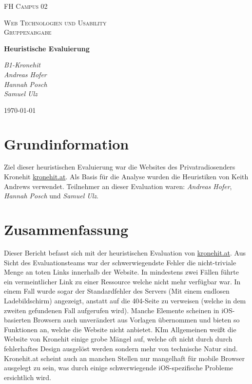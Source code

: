 \documentclass{article}
\begin{document}
	\begin{titlepage}
		\centering
		{\scshape\LARGE FH Campus 02 \par}
		\vspace{1cm}
		{\scshape\Large Web Technologien und Usability \\ Gruppenabgabe\par}
		\vspace{1.5cm}
		{\huge\bfseries Heuristische Evaluierung\par}
		\vspace{2cm}
		{\Large\itshape B1-Kronehit \\ Andreas Hofer \\ Hannah Posch \\ Samuel Ulz\par}
		\vfill
		{\large \today\par}
	\end{titlepage}
	\tableofcontents
	\newpage
	\section{Grundinformation}
	Ziel dieser heuristischen Evaluierung war die Websites des Privatradiosenders Kronehit \href{https://kronehit.at}{kronehit.at}. Als Basis für die Analyse wurden die Heuristiken von Keith Andrews verwendet. Teilnehmer an dieser Evaluation waren: \textit{Andreas Hofer}, \textit{Hannah Posch} und \textit{Samuel Ulz}.
	\section{Zusammenfassung}
	Dieser Bericht befasst sich mit der heuristischen Evaluation von \href{https://kronehit.at}{kronehit.at}. Aus Sicht des Evaluationsteams war der schwerwiegendste Fehler die nicht-triviale Menge an toten Links innerhalb der Website. In mindestens zwei Fällen führte ein vermeintlicher Link zu einer Ressource welche nicht mehr verfügbar war. In einem Fall wurde sogar der Standardfehler des Servers (Mit einem endlosen Ladebildschirm) angezeigt, anstatt auf die 404-Seite zu verweisen (welche in dem zweiten gefundenen Fall aufgerufen wird). Manche Elemente scheinen in iOS-basierten Browsern auch unverändert aus Vorlagen übernommen und bieten so Funktionen an, welche die Website nicht anbietet. KIm Allgemeinen weißt die Website von Kronehit einige grobe Mängel auf, welche oft nicht durch durch fehlerhaftes Design ausgelöst werden sondern mehr von technische Natur sind. Kronehit.at scheint auch an manchen Stellen nur mangelhaft für mobile Browser ausgelegt zu sein, was durch einige schwerwiegende iOS-spezifische Probleme ersichtlich wird.
\end{document}
